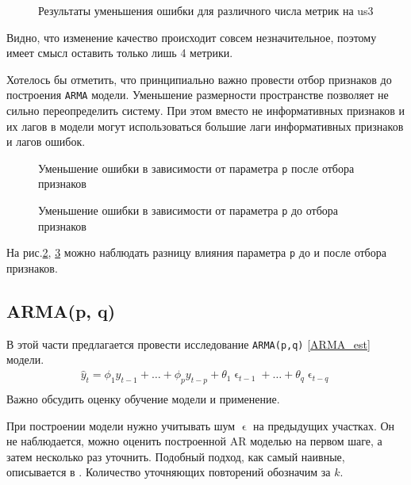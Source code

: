 \documentclass[14pt, a4paper]{extarticle}
\begin{document}
	\begin{figure}[!htb]
		\centerline{}
		\caption{Результаты уменьшения ошибки для различного числа метрик на us3}
		\label{fig:mae_num_of_m}
	\end{figure}

	Видно, что изменение качество происходит совсем незначительное, поэтому имеет смысл оставить только лишь 4 метрики.
	
	Хотелось бы отметить, что принципиально важно провести отбор признаков до построения \texttt{ARMA} модели.
	Уменьшение размерности пространстве позволяет не сильно переопределить систему.
	При этом вместо не информативных признаков и их лагов в модели могут использоваться большие лаги информативных признаков и  лагов ошибок.

	\begin{figure}[!htb]
		\centerline{}
		\caption{Уменьшение ошибки в зависимости от параметра \texttt{p} после отбора признаков}
		\label{fig:p_after_metric_selection}
	\end{figure}	
	
	
	\begin{figure}[!htb]
		\centerline{}
		\caption{Уменьшение ошибки в зависимости от параметра \texttt{p} до отбора признаков}
		\label{fig:p_before_metric_selection}
	\end{figure}

	На рис.\ref{fig:p_after_metric_selection}, \ref{fig:p_before_metric_selection} можно наблюдать разницу влияния параметра \texttt{p} до и после отбора признаков.
	
	
	\subsection{ARMA(p, q)}
	В этой части предлагается провести исследование \texttt{ARMA(p,q)} \ref{ARMA_est} модели.
	\begin{align}
	\hat{y}_t = \phi_1y_{t-1} + \dots + \phi_py_{t-p} + \theta_1 \upvarepsilon_{t-1} + \dots + \theta_q \upvarepsilon_{t-q}\nonumber \\ \label{ARMA_est}
	\end{align}
	Важно обсудить оценку обучение модели и применение.
	
	При построении модели нужно учитывать шум $\upvarepsilon$ на предыдущих участках. Он не наблюдается, можно оценить построенной AR моделью на первом шаге, а затем несколько раз уточнить. Подобный подход, как самый наивные, описывается в \cite{lib_arma_est}. Количество уточняющих повторений обозначим за $k$.
	
\end{document}
